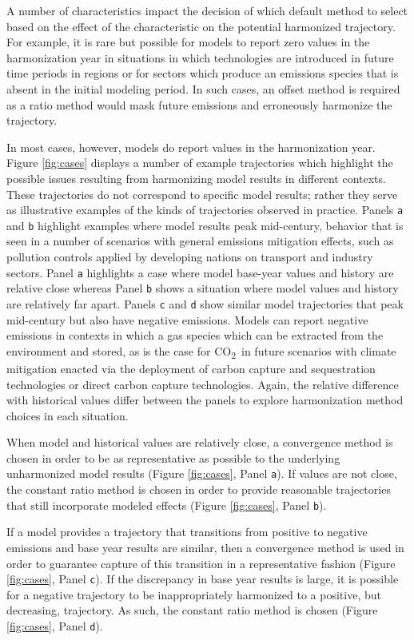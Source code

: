\documentclass[review]{elsarticle}
\newcommand{\code}[1]{\lstinline[basicstyle=\ttfamily\color{black}]|#1|}
\newcommand{\cotwo}{CO\textsubscript{2}~}
\begin{document}
A number of characteristics impact the decision of which default method to
select based on the effect of the characteristic on the potential harmonized
trajectory. For example, it is rare but possible for models to report zero
values in the harmonization year in situations in which technologies are
introduced in future time periods in regions or for sectors which produce an
emissions species that is absent in the initial modeling period. In such cases,
an offset method is required as a ratio method would mask future emissions and
erroneously harmonize the trajectory.

In most cases, however, models do report values in the harmonization
year. Figure \ref{fig:cases} displays a number of example trajectories which
highlight the possible issues resulting from harmonizing model results in
different contexts. These trajectories do not correspond to specific model
results; rather they serve as illustrative examples of the kinds of trajectories
observed in practice. Panels \code{a} and \code{b} highlight examples where
model results peak mid-century, behavior that is seen in a number of scenarios
with general emissions mitigation effects, such as pollution controls applied by
developing nations on transport and industry sectors. Panel \code{a} highlights
a case where model base-year values and history are relative close whereas Panel
\code{b} shows a situation where model values and history are relatively far
apart. Panels \code{c} and \code{d} show similar model trajectories that peak
mid-century but also have negative emissions. Models can report negative
emissions in contexts in which a gas species which can be extracted from the
environment and stored, as is the case for \cotwo in future scenarios with
climate mitigation enacted via the deployment of carbon capture and
sequestration technologies or direct carbon capture technologies. Again, the
relative difference with historical values differ between the panels to explore
harmonization method choices in each situation.

When model and historical values are relatively close, a convergence method is
chosen in order to be as representative as possible to the underlying
unharmonized model results (Figure \ref{fig:cases}, Panel \code{a}). If values
are not close, the constant ratio method is chosen in order to provide
reasonable trajectories that still incorporate modeled effects (Figure
\ref{fig:cases}, Panel \code{b}).

If a model provides a trajectory that transitions from positive to negative
emissions and base year results are similar, then a convergence method is used
in order to guarantee capture of this transition in a representative fashion
(Figure \ref{fig:cases}, Panel \code{c}). If the discrepancy in base year
results is large, it is possible for a negative trajectory to be inappropriately
harmonized to a positive, but decreasing, trajectory. As such, the constant
ratio method is chosen (Figure \ref{fig:cases}, Panel \code{d}).
\end{document}
